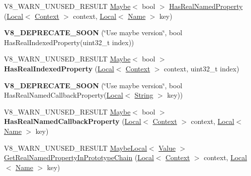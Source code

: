 \begin{DoxyCompactItemize}
\item 
V8\+\_\+\+W\+A\+R\+N\+\_\+\+U\+N\+U\+S\+E\+D\+\_\+\+R\+E\+S\+U\+LT \mbox{\hyperlink{classv8_1_1Maybe}{Maybe}}$<$ bool $>$ \mbox{\hyperlink{classv8_1_1Object_ad830b937c7586fe2086b288ea79935c4}{Has\+Real\+Named\+Property}} (\mbox{\hyperlink{classv8_1_1Local}{Local}}$<$ \mbox{\hyperlink{classv8_1_1Context}{Context}} $>$ context, \mbox{\hyperlink{classv8_1_1Local}{Local}}$<$ \mbox{\hyperlink{classv8_1_1Name}{Name}} $>$ key)
\item 
\mbox{\label{classv8_1_1Object_abd04e5cb82426a70ebea6afec8687c9e}} 
{\bfseries V8\+\_\+\+D\+E\+P\+R\+E\+C\+A\+T\+E\+\_\+\+S\+O\+ON} (\char`\"{}Use maybe version\char`\"{}, bool Has\+Real\+Indexed\+Property(uint32\+\_\+t index))
\item 
\mbox{\label{classv8_1_1Object_a46de2f348f4caafca287328ce385ab56}} 
V8\+\_\+\+W\+A\+R\+N\+\_\+\+U\+N\+U\+S\+E\+D\+\_\+\+R\+E\+S\+U\+LT \mbox{\hyperlink{classv8_1_1Maybe}{Maybe}}$<$ bool $>$ {\bfseries Has\+Real\+Indexed\+Property} (\mbox{\hyperlink{classv8_1_1Local}{Local}}$<$ \mbox{\hyperlink{classv8_1_1Context}{Context}} $>$ context, uint32\+\_\+t index)
\item 
\mbox{\label{classv8_1_1Object_ae1ffb11a0fa7549652d0530c0c4c4ca6}} 
{\bfseries V8\+\_\+\+D\+E\+P\+R\+E\+C\+A\+T\+E\+\_\+\+S\+O\+ON} (\char`\"{}Use maybe version\char`\"{}, bool Has\+Real\+Named\+Callback\+Property(\mbox{\hyperlink{classv8_1_1Local}{Local}}$<$ \mbox{\hyperlink{classv8_1_1String}{String}} $>$ key))
\item 
\mbox{\label{classv8_1_1Object_a62bde6bea1ce32b30b2152f33a105b14}} 
V8\+\_\+\+W\+A\+R\+N\+\_\+\+U\+N\+U\+S\+E\+D\+\_\+\+R\+E\+S\+U\+LT \mbox{\hyperlink{classv8_1_1Maybe}{Maybe}}$<$ bool $>$ {\bfseries Has\+Real\+Named\+Callback\+Property} (\mbox{\hyperlink{classv8_1_1Local}{Local}}$<$ \mbox{\hyperlink{classv8_1_1Context}{Context}} $>$ context, \mbox{\hyperlink{classv8_1_1Local}{Local}}$<$ \mbox{\hyperlink{classv8_1_1Name}{Name}} $>$ key)
\item 
V8\+\_\+\+W\+A\+R\+N\+\_\+\+U\+N\+U\+S\+E\+D\+\_\+\+R\+E\+S\+U\+LT \mbox{\hyperlink{classv8_1_1MaybeLocal}{Maybe\+Local}}$<$ \mbox{\hyperlink{classv8_1_1Value}{Value}} $>$ \mbox{\hyperlink{classv8_1_1Object_afe68d490fc41783e30126ca547b7fc90}{Get\+Real\+Named\+Property\+In\+Prototype\+Chain}} (\mbox{\hyperlink{classv8_1_1Local}{Local}}$<$ \mbox{\hyperlink{classv8_1_1Context}{Context}} $>$ context, \mbox{\hyperlink{classv8_1_1Local}{Local}}$<$ \mbox{\hyperlink{classv8_1_1Name}{Name}} $>$ key)

\end{DoxyCompactItemize}
